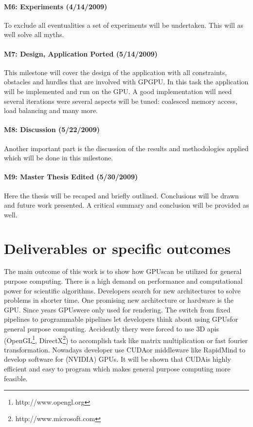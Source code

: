 \paragraph{M6: Experiments (4/14/2009)} %
\label{par:m6_experiments}
To exclude all eventualities a set of experiments will be undertaken. This will 
as well solve all myths.
\paragraph{M7: Design, Application Ported (5/14/2009)} %
\label{par:m7_design_application_ported}
This milestone will cover the design of the application with all constraints,
obstacles and hurdles that are involved with GPGPU. In this task the application
will be implemented and run on the GPU. A good implementation will need several
iterations were several aspects will be tuned: coalesced memory access, load
balancing and many more.
\paragraph{M8: Discussion (5/22/2009)} %
\label{par:m8_discussion}
Another important part is the discussion of the results and methodologies
applied which will be done in this milestone.

\paragraph{M9: Master Thesis Edited (5/30/2009)} %
\label{par:master_thesis_edited}
Here the thesis will be recaped and briefly outlined. Conclusions will be drawn
and future work presented. A critical summary and conclusion will be provided as
well. %

\section*{Deliverables or specific outcomes} 
\label{sub:deliverables_or_specific_outcomes} 
The main outcome of this work is to show how \glspl{GPU}can be utilized for general
purpose computing. There is a high demand on performance and computational power
for scientific algorithms. Developers search for new architectures to solve
problems in shorter time. One promising new architecture or hardware is the GPU.
Since years \glspl{GPU}were only used for rendering. The switch from fixed pipelines
to programmable pipelines let developers think about using \glspl{GPU}for general
purpose computing. Accidently thery were forced to use 3D apis
(OpenGL\footnote{http://www.opengl.org},
DirectX\footnote{http://www.microsoft.com}) to accomplish task like matrix
multiplication or fast fourier transformation. Nowadays developer use \gls{CUDA}or
middleware like RapidMind to develop software for (NVIDIA) GPUs. It will be
shown that \gls{CUDA}is highly efficient and easy to program which makes general
purpose computing more feasible.

